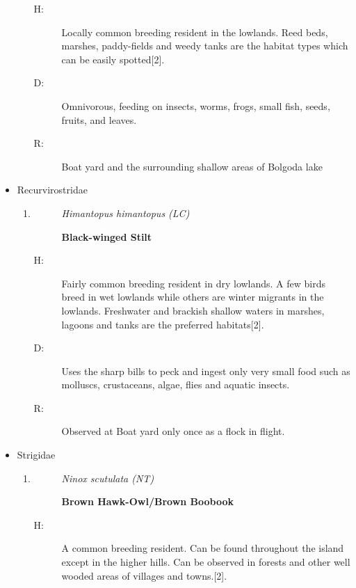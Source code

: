 \begin{itemize}
\begin{enumerate}
\begin{description}
\end{description}%
\begin{description}%
\item[H: ]%
Locally common breeding resident in the lowlands. Reed beds, marshes, paddy-fields and weedy tanks are the habitat types which can be easily spotted{[}2{]}.%
\item[D: ]%
Omnivorous, feeding on insects, worms, frogs, small fish, seeds, fruits, and leaves.%
\item[R: ]%
Boat yard and the surrounding shallow areas of Bolgoda lake%
\end{description}%
\end{enumerate}%
\item%
Recurvirostridae%
\begin{enumerate}%
\item%
\begin{description}%
\item[]%
\textit{Himantopus himantopus (LC)}%
\item[]%
\textbf{Black{-}winged Stilt}%
\end{description}%
\begin{description}%
\item[H: ]%
Fairly common breeding resident in dry lowlands. A few birds breed in wet lowlands while others are winter migrants in the lowlands. Freshwater and brackish shallow waters in marshes, lagoons and tanks are the preferred habitats{[}2{]}.%
\item[D: ]%
Uses the sharp bills to peck and ingest only very small food such as molluscs, crustaceans, algae, flies and aquatic insects.%
\item[R: ]%
Observed at Boat yard only once as a flock in flight.%
\end{description}%
\end{enumerate}%
\item%
Strigidae%
\begin{enumerate}%
\item%
\begin{description}%
\item[]%
\textit{Ninox scutulata (NT)}%
\item[]%
\textbf{Brown Hawk{-}Owl/Brown Boobook}%
\end{description}%
\begin{description}%
\item[H: ]%
A common breeding resident. Can be found throughout the island except in the higher hills. Can be observed in forests and other well wooded areas of villages and towns.{[}2{]}.%

\end{description}
\end{enumerate}
\end{itemize}
